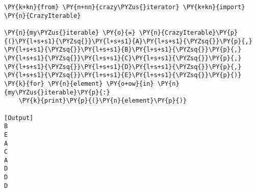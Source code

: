 \begin{Verbatim}[label=\makebox{\url{https://github.com/lucabaldini/cmepda/tree/master/slides/latex/snippets/test\_crazy\_iterator.py}},commandchars=\\\{\}]
\PY{k+kn}{from} \PY{n+nn}{crazy\PYZus{}iterator} \PY{k+kn}{import} \PY{n}{CrazyIterable}
   
\PY{n}{my\PYZus{}iterable} \PY{o}{=} \PY{n}{CrazyIterable}\PY{p}{(}\PY{l+s+s1}{\PYZsq{}}\PY{l+s+s1}{A}\PY{l+s+s1}{\PYZsq{}}\PY{p}{,} \PY{l+s+s1}{\PYZsq{}}\PY{l+s+s1}{B}\PY{l+s+s1}{\PYZsq{}}\PY{p}{,} \PY{l+s+s1}{\PYZsq{}}\PY{l+s+s1}{C}\PY{l+s+s1}{\PYZsq{}}\PY{p}{,} \PY{l+s+s1}{\PYZsq{}}\PY{l+s+s1}{D}\PY{l+s+s1}{\PYZsq{}}\PY{p}{,} \PY{l+s+s1}{\PYZsq{}}\PY{l+s+s1}{E}\PY{l+s+s1}{\PYZsq{}}\PY{p}{)}
\PY{k}{for} \PY{n}{element} \PY{o+ow}{in} \PY{n}{my\PYZus{}iterable}\PY{p}{:}
    \PY{k}{print}\PY{p}{(}\PY{n}{element}\PY{p}{)}

[Output]
B
E
A
C
A
D
D
D
\end{Verbatim}